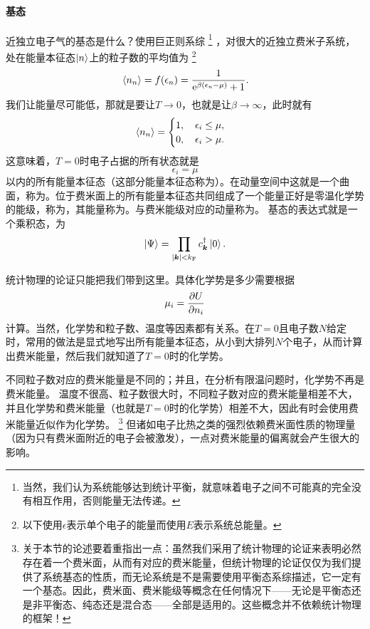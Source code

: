 \paragraph{基态} 近独立电子气的基态是什么？使用巨正则系综%
\footnote{当然，我们认为系统能够达到统计平衡，就意味着电子之间不可能真的完全没有相互作用，否则能量无法传递。}%
，对很大的近独立费米子系统，处在能量本征态$\ket{n}$上的粒子数的平均值为%
\footnote{以下使用$\epsilon$表示单个电子的能量而使用$E$表示系统总能量。}%
\begin{equation}
    \expval*{{n}_n} = f(\epsilon_n) = \frac{1}{\mathrm{e}^{\beta (\epsilon_n-\mu)} + 1}.
    \label{eq:fermi-dirac-distribution}
\end{equation}
我们让能量尽可能低，那就是要让$T\to 0$，也就是让$\beta\to \infty$，此时就有
\begin{equation}
    \expval*{{n}_n} = \begin{cases}
        1, \quad \epsilon_i \leq \mu, \\
        0, \quad \epsilon_i > \mu.
    \end{cases}
\end{equation}
这意味着，$T=0$时电子占据的所有状态就是
\begin{equation}
    \epsilon_i = \mu
\end{equation}
以内的所有能量本征态（这部分能量本征态称为）。在动量空间中这就是一个曲面，称为。位于费米面上的所有能量本征态共同组成了一个能量正好是零温化学势的能级，称为，其能量称为。与费米能级对应的动量称为。
基态的表达式就是一个乘积态，为
\begin{equation}
    \ket{\Psi} = \prod_{\abs{\vb*{k}} < k_\text{F}} {c}^\dagger_{\vb*{k}} \ket{0}.
    \label{eq:ground-state}
\end{equation}

统计物理的论证只能把我们带到这里。具体化学势是多少需要根据
\begin{equation}
    \mu_i = \pdv{U}{n_i}
\end{equation}
计算。当然，化学势和粒子数、温度等因素都有关系。在$T=0$且电子数$N$给定时，常用的做法是显式地写出所有能量本征态，从小到大排列$N$个电子，从而计算出费米能量，然后我们就知道了$T=0$时的化学势。

不同粒子数对应的费米能量是不同的；并且，在分析有限温问题时，化学势不再是费米能量。
温度不很高、粒子数很大时，不同粒子数对应的费米能量相差不大，并且化学势和费米能量（也就是$T=0$时的化学势）相差不大，因此有时会使用费米能量近似作为化学势。%
\footnote{关于本节的论述要着重指出一点：虽然我们采用了统计物理的论证来表明必然存在着一个费米面，从而有对应的费米能量，但统计物理的论证仅仅为我们提供了系统基态的性质，而无论系统是不是需要使用平衡态系综描述，它一定有一个基态。因此，费米面、费米能级等概念在任何情况下——无论是平衡态还是非平衡态、纯态还是混合态——全部是适用的。这些概念并不依赖统计物理的框架！}%
但诸如电子比热之类的强烈依赖费米面性质的物理量（因为只有费米面附近的电子会被激发），一点对费米能量的偏离就会产生很大的影响。

